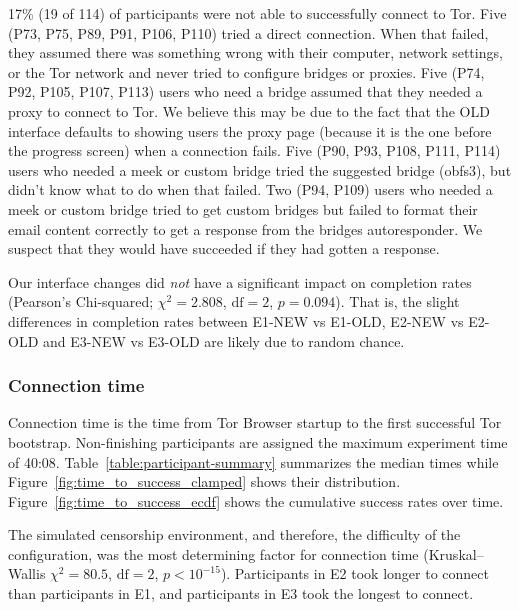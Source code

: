 \documentclass[USenglish,oneside,twocolumn]{article}
\begin{document}
17\% (19 of 114) of participants were not able to successfully connect to Tor. Five (P73, P75, P89, P91, P106, P110) tried a direct connection. When that failed, they assumed there was something wrong with their computer, network settings, or the Tor network and never tried to configure bridges or proxies. Five (P74, P92, P105, P107, P113) users who need a bridge assumed that they needed a proxy to connect to Tor. We believe this may be due to the fact that the OLD interface defaults to showing users the proxy page (because it is the one before the progress screen) when a connection fails. Five (P90, P93, P108, P111, P114) users who needed a meek or custom bridge tried the suggested bridge (obfs3), but didn't know what to do when that failed. Two (P94, P109) users who needed a meek or custom bridge tried to get custom bridges but failed to format their email content correctly to get a response from the bridges autoresponder. We suspect that they would have succeeded if they had gotten a response.

Our interface changes did {\it not} have a significant impact on completion rates (Pearson's Chi-squared; $\chi^2 = 2.808$, $\mbox{df} = 2$, $p = 0.094$). That is, the slight differences in completion rates between E1-NEW vs E1-OLD, E2-NEW vs E2-OLD and E3-NEW vs E3-OLD are likely due to random chance.


\subsubsection{Connection time} 
Connection time is the time from Tor Browser startup to the first successful Tor bootstrap. Non-finishing participants are assigned the maximum experiment time of 40:08. Table~\ref{table:participant-summary} summarizes the median times while Figure~\ref{fig:time_to_success_clamped} shows their distribution. Figure~\ref{fig:time_to_success_ecdf} shows the cumulative success rates over time. 

The simulated censorship environment, and therefore, the difficulty of the configuration, was the most determining factor for connection time (Kruskal--Wallis $\chi^2 = 80.5$, $\mbox{df} = 2$, $p < 10^{-15}$). Participants in E2 took longer to connect than participants in E1, and participants in E3 took the longest to connect.
\end{document}
